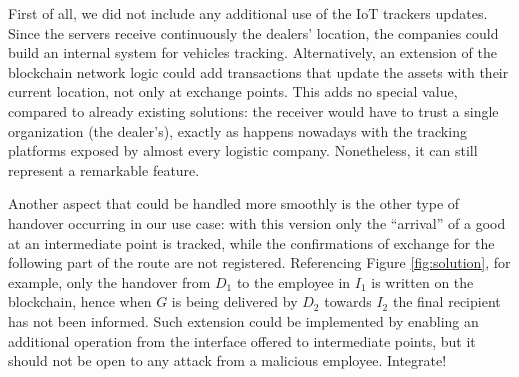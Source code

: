 First of all, we did not include any additional use of the IoT trackers updates. Since the servers receive continuously the dealers' location, the companies could build an internal system for vehicles tracking. Alternatively, an extension of the blockchain network logic could add transactions that update the assets with their current location, not only at exchange points. This adds no special value, compared to already existing solutions: the receiver would have to trust a single organization (the dealer's), exactly as happens nowadays with the tracking platforms exposed by almost every logistic company. Nonetheless, it can still represent a remarkable feature.

Another aspect that could be handled more smoothly is the other type of handover occurring in our use case: with this version only the ``arrival'' of a good at an intermediate point is tracked, while the confirmations of exchange for the following part of the route are not registered. Referencing Figure \ref{fig:solution}, for example, only the handover from $D_1$ to the employee in $I_1$ is written on the blockchain, hence when $G$ is being delivered by $D_2$ towards $I_2$ the final recipient has not been informed. Such extension could be implemented by enabling an additional operation from the interface offered to intermediate points, but it should not be open to any attack from a malicious employee. Integrate!


